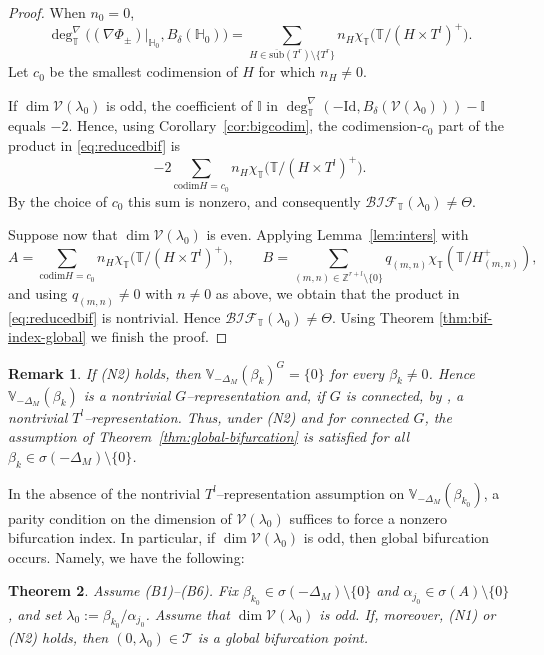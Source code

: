 \documentclass[reqno,twoside,12pt]{amsart}
\newtheorem{Remark}{Remark}[section]
\newtheorem{Theorem}[Remark]{Theorem}
\newcommand{\bH}{\mathbb{H}}
\newcommand{\bI}{\mathbb{I}}
\newcommand{\bT}{\mathbb{T}}
\newcommand{\bV}{\mathbb{V}}
\newcommand{\cT}{\mathcal{T}}
\newcommand{\cV}{\mathcal{V}}
\numberwithin{equation}{section} \errorcontextlines=0
\newcommand{\codim}{\mathrm{ codim  }}
\newcommand{\sub}{\overline{\mathrm{sub}}}
\newcommand{\bif}{\mathcal{BIF}}
\begin{document}
\begin{proof}
When $n_{0}=0$,
\[
\deg^{\nabla}_{\bT}\bigl((\nabla\Phi_{\pm})|_{\bH_0},B_{\delta}(\bH_0)\bigr)
=\sum_{H\in\sub(T^{r})\setminus \{T^r\}} n_{H} \chi_{\bT}\bigl(\bT/(H\times T^{l})^{+}\bigr).
\]
Let $c_0$ be the smallest codimension of $H$ for which $n_H\neq 0$.

If $\dim \cV(\lambda_0)$ is odd, the coefficient of $\bI$ in
$\deg^{\nabla}_{\bT}(-\mathrm{Id},B_{\delta}(\cV(\lambda_{0})))-\bI$ equals $-2$. Hence, using Corollary~\ref{cor:bigcodim}, the codimension-$c_0$ part of the product in \eqref{eq:reducedbif} is
$$
-2\sum_{\codim H=c_0} n_{H} \chi_{\bT}\bigl(\bT/(H\times T^{l})^{+}\bigr).
$$
By the choice of $c_0$ this sum is nonzero, and consequently $\bif_{\bT}(\lambda_{0})\neq \Theta$.

Suppose now that $\dim \cV(\lambda_0)$ is even.
Applying Lemma~\ref{lem:inters} with
\[
A=\sum_{\codim H=c_0} n_{H} \chi_{\bT}\bigl(\bT/(H\times T^{l})^{+}\bigr),\qquad
B=\sum_{(m,n)\in\mathbb{Z}^{r+l}\setminus\{0\}} q_{(m,n)} \chi_{\bT}(\bT/H_{(m,n)}^{+}),
\]
and using $q_{(m,n)}\ne 0$ with $n\ne 0$ as above, we obtain that the product in \eqref{eq:reducedbif} is nontrivial. Hence $\bif_{\bT}(\lambda_{0})\ne \Theta$.
Using Theorem \ref{thm:bif-index-global} we finish the proof.
\end{proof}

\begin{Remark}
If \textnormal{(N2)} holds, then $\bV_{-\Delta_M}(\beta_k)^{G}=\{0\}$ for every $\beta_k\ne 0$. Hence $\bV_{-\Delta_M}(\beta_k)$ is a nontrivial $G$–representation and, if $G$ is connected, by \cite[Lemma~3.3]{GarRyb}, a nontrivial $T^{l}$–representation. Thus, under \textnormal{(N2)} and for connected $G$, the assumption of Theorem~\ref{thm:global-bifurcation} is satisfied for all $\beta_{k}\in\sigma(-\Delta_M)\setminus\{0\}$.
\end{Remark}

In the absence of the nontrivial $T^{l}$–representation assumption on $\bV_{-\Delta_M}(\beta_{k_0})$, a parity condition on  the dimension of  $\cV(\lambda_0)$ suffices to force a nonzero bifurcation index. In particular, if $\dim\cV(\lambda_0)$ is odd, then global bifurcation occurs. Namely, we have the following:

\begin{Theorem}\label{thm:global-bifurcation-trivial}
Assume \textnormal{(B1)}--\textnormal{(B6)}. Fix $\beta_{k_{0}}\in\sigma(-\Delta_{M})\setminus\{0\}$ and $\alpha_{j_{0}}\in\sigma(A)\setminus\{0\}$, and set $\lambda_{0}:=\beta_{k_{0}}/\alpha_{j_{0}}$.
Assume that $\dim \cV(\lambda_0)$ is odd.
If, moreover, \textnormal{(N1)} or \textnormal{(N2)} holds,
then $(0,\lambda_{0})\in\cT$ is a global bifurcation point.
\end{Theorem}
\end{document}
